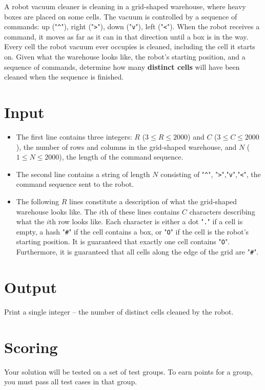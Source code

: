 
A robot vacuum cleaner is cleaning in a grid-shaped warehouse, where heavy boxes are placed on some cells. The vacuum is controlled by a sequence of commands: up ("\verb|^|"), right ("\verb|>|"), down ("\verb|v|"), left ("\verb|<|").
When the robot receives a command, it moves as far as it can in that direction until a box is in the way. Every cell the robot vacuum ever occupies is cleaned, including the cell it starts on. Given what the warehouse looks like, the robot's starting position, and a sequence of commands, determine how many \textbf{distinct cells} will have been cleaned when the sequence is finished.

\section*{Input}
\begin{itemize}
  \item
    The first line contains three integers: $R$ ($3 \le R \le 2000$) and $C$ ($3 \le C \le 2000$),
    the number of rows and columns in the grid-shaped warehouse, and $N$ ($1 \le N \le 2000$), the length of the command sequence.

  \item
    The second line contains a string of length $N$ consisting of "\verb|^|", "\verb|>|","\verb|v|","\verb|<|", the command sequence sent to the robot.

  \item
    The following $R$ lines constitute a description of what the grid-shaped warehouse looks like.
    The $i$th of these lines contains $C$ characters describing what the $i$th row looks like.
    Each character is either a dot "\verb|.|" if a cell is empty, a hash "\verb|#|" if the cell contains a box, or "\verb|O|" if the cell is the robot's starting position. It is guaranteed that exactly one cell contains "\verb|O|". Furthermore, it is guaranteed that all cells along the edge of the grid are "\verb|#|".
\end{itemize}

\section*{Output}
Print a single integer -- the number of distinct cells cleaned by the robot.

\section*{Scoring}
Your solution will be tested on a set of test groups.
To earn points for a group, you must pass all test cases in that group.

